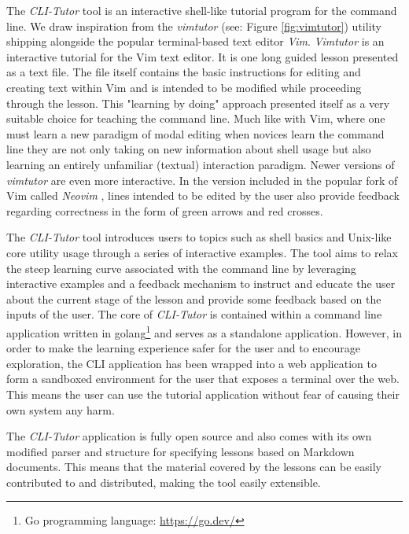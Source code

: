 The \textit{CLI-Tutor} tool is an interactive shell-like tutorial program for
the command line. We draw inspiration from the
\textit{vimtutor}\cite{pierce_ware_smith_moolenaar_2019} (see: Figure
\ref{fig:vimtutor}) utility shipping alongside the popular terminal-based text
editor \textit{Vim}. \textit{Vimtutor} is an interactive tutorial for the Vim text
editor. It is one long guided lesson presented as a text file. The file itself
contains the basic instructions for editing and creating text within Vim and is
intended to be modified while proceeding through the lesson. This "learning by
doing" approach presented itself as a very suitable choice for teaching the
command line. Much like with Vim, where one must learn a new paradigm of modal
editing when novices learn the command line they are not only taking on new
information about shell usage but also learning an entirely unfamiliar
(textual) interaction paradigm. Newer versions of \textit{vimtutor} are even more
interactive. In the version included in the popular fork of Vim called \textit{Neovim}
\cite{neovimHomeNeovim}, lines intended to be edited by the user also provide
feedback regarding correctness in the form of green arrows and red crosses.

The \textit{CLI-Tutor} tool introduces users to topics such as shell basics and
Unix-like core utility usage through a series of interactive examples. The tool
aims to relax the steep learning curve associated with the command line by
leveraging interactive examples and a feedback mechanism to instruct and
educate the user about the current stage of the lesson and provide some
feedback based on the inputs of the user. The core of \textit{CLI-Tutor} is
contained within a command line application written in golang\footnote{Go
	programming language: \href{https://go.dev/}{https://go.dev/}} and serves as a
standalone application. However, in order to make the learning experience safer
for the user and to encourage exploration, the CLI application has been wrapped
into a web application to form a sandboxed environment for the user that
exposes a terminal over the web. This means the user can use the tutorial
application without fear of causing their own system any harm.

The \textit{CLI-Tutor} application is fully open source and also comes with its
own modified parser and structure for specifying lessons based on Markdown
documents. This means that the material covered by the lessons can be easily
contributed to and distributed, making the tool easily extensible.


